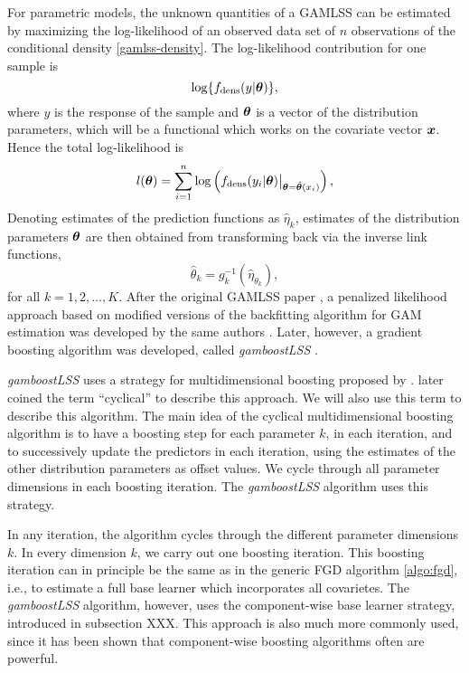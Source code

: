 For parametric models, the unknown quantities of a GAMLSS can be estimated by maximizing the log-likelihood of an observed
data set of $n$ observations of the conditional density \eqref{gamlss-density}.
The log-likelihood contribution for one sample is
\begin{equation}
    \log\{f_{\text{dens}}(y|\boldsymbol{\theta})\},
\end{equation}
where $y$ is the response of the sample and $\boldsymbol{\theta}$ is a vector of the distribution parameters, which will be a functional
which works on the covariate vector $\bm{x}$. Hence the total log-likelihood is
\begin{equation}
    l(\boldsymbol{\theta})=\sum_{i=1}^n\log\left(f_{\text{dens}}(y_i|\boldsymbol{\theta})\big\rvert_{\boldsymbol{\theta}=\hat{\boldsymbol{\theta}}(x_i)}\right),
\end{equation}
Denoting estimates of the prediction functions as $\hat{\eta}_k$,
estimates of the distribution parameters $\boldsymbol{\theta}$ are then obtained from transforming back via the inverse link functions,
\begin{equation}
    \hat{\theta}_k=g_k^{-1}(\hat{\eta}_{\theta_k}),
\end{equation}
for all $k=1,2,\ldots,K$. After the original GAMLSS paper \citep{gamlss}, a penalized likelihood approach based on modified versions
of the backfitting algorithm for GAM estimation was developed by the same authors \citep{gamlssR}. Later, however, a gradient boosting
algorithm was developed, called \textit{gamboostLSS} \citep{gamboostlss-paper}.

\textit{gamboostLSS} uses a strategy for multidimensional boosting proposed by \citet{schmid}.
\citet{thomas2018} later coined the term ``cyclical'' to describe this approach. We will also use this term to describe this algorithm.
The main idea of the cyclical multidimensional boosting algorithm is to have a boosting step for each parameter $k$, in each iteration, and to successively update the predictors in each iteration, using the estimates of the other distribution parameters
as offset values. We cycle through all parameter dimensions in each boosting iteration. The \textit{gamboostLSS} algorithm uses this strategy.

In any iteration, the algorithm cycles through the different parameter dimensions $k$. In every dimension $k$, we carry out one boosting iteration. This boosting iteration can in principle be the same as in the generic FGD algorithm \eqref{algo:fgd}, i.e., to estimate a full base learner which incorporates all covarietes.
The \textit{gamboostLSS} algorithm, however, uses the component-wise base learner strategy, introduced in subsection XXX.
This approach is also much more commonly used, since it has been shown that component-wise boosting algorithms often are powerful.

